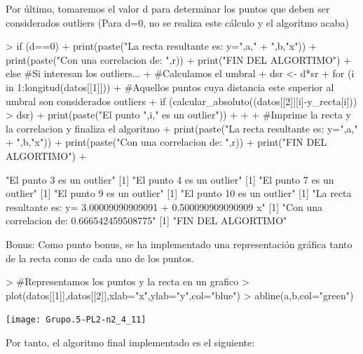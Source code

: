 \documentclass[parskip=full]{scrartcl}
\begin{document}
Por último, tomaremos el valor d para determinar los puntos que deben ser considerados outliers (Para d=0, no se realiza este cálculo y el algoritmo acaba)


\begin{Schunk}
\begin{Sinput}
> if (d==0){
+ print(paste("La recta resultante es: y=",a," + ",b,"x"))
+ print(paste("Con una correlacion de: ",r))
+ print("FIN DEL ALGORTIMO")
+ } else { #Si interesan los outliers...
+ #Calculamos el umbral
+ dsr <- d*sr
+ for (i in 1:longitud(datos[[1]])){
+   #Aquellos puntos cuya distancia este superior al umbral son considerados outliers
+   if (calcular_absoluto((datos[[2]][i]-y_recta[i])) > dsr){
+     print(paste("El punto ",i," es un outlier"))
+   }
+ }
+ #Imprime la recta y la correlacion y finaliza el algoritmo
+ print(paste("La recta resultante es: y=",a," + ",b,"x"))
+ print(paste("Con una correlacion de: ",r))
+ print("FIN DEL ALGORTIMO")
+ }
\end{Sinput}
\begin{Soutput}
[1] "El punto  3  es un outlier"
[1] "El punto  4  es un outlier"
[1] "El punto  7  es un outlier"
[1] "El punto  9  es un outlier"
[1] "El punto  10  es un outlier"
[1] "La recta resultante es: y= 3.00009090909091  +  0.500090909090909 x"
[1] "Con una correlacion de:  0.666542459508775"
[1] "FIN DEL ALGORTIMO"
\end{Soutput}
\end{Schunk}


Bonus: Como punto bonus, se ha implementado una representación gráfica tanto de la recta como de cada uno de los puntos.


\begin{Schunk}
\begin{Sinput}
> #Representamos los puntos y la recta en un grafico
> plot(datos[[1]],datos[[2]],xlab="x",ylab="y",col="blue")
> abline(a,b,col="green")
\end{Sinput}
\end{Schunk}
\texttt{[image: Grupo.5-PL2-n2\_4\_11]}


Por tanto, el algoritmo final implementado es el siguiente: 
\end{document}
